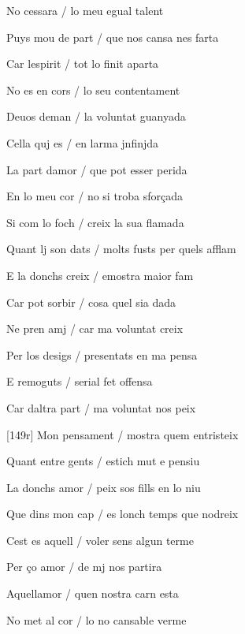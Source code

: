 \documentclass[12pt]{article}
\begin{document}
\begin{estrofa}

 No cessara / lo meu egual talent

 Puys mou de part / que nos cansa nes farta

 Car lespirit / tot lo finit aparta

 No es en cors / lo seu contentament

 Deuos deman / la voluntat guanyada

 Cella quj es / en larma jnfinjda

 La part damor / que pot esser perida

 En lo meu cor / no si troba sfor\c{c}ada

\end{estrofa}



\begin{estrofa}

 Si com lo foch / creix la sua flamada

 Quant lj son dats / molts fusts per quels afflam

 E la donchs creix / emostra maior fam

 Car pot sorbir / cosa quel sia dada

 Ne pren amj / car ma voluntat creix

 Per los desigs / presentats en ma pensa

 E remoguts / serial fet offensa

 Car daltra part / ma voluntat nos peix

\end{estrofa}



\begin{estrofa}

 [149r] Mon pensament / mostra quem entristeix

 Quant entre gents / estich mut e pensiu

 La donchs amor / peix sos fills en lo niu

 Que dins mon cap / es lonch temps que nodreix

 Cest es aquell / voler sens algun terme

 Per \c{c}o amor / de mj nos partira

 Aquellamor / quen nostra carn esta

 No met al cor / lo no cansable verme

\end{estrofa}
\end{document}
